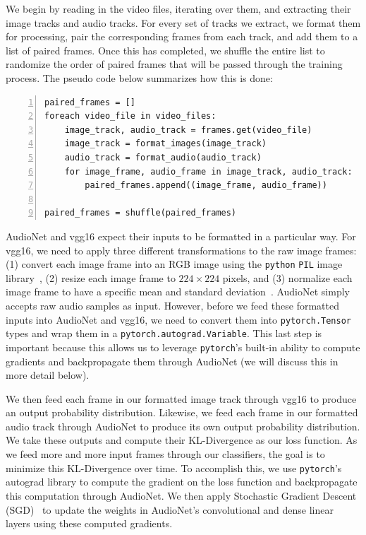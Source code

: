 \documentclass[12pt,twoside]{article}
\theoremstyle{plain}
\theoremstyle{definition}
\theoremstyle{remark}
\begin{document}
\noindent
We begin by reading in the video files, iterating over them, and extracting their image tracks and audio tracks.
For every set of tracks we extract, we format them for processing, pair the corresponding frames from each track, and add them to a list of paired frames.
Once this has completed, we shuffle the entire list to randomize the order of paired frames that will be passed through the training process.
The pseudo code below summarizes how this is done:

{\setlength{\fboxsep}{10pt}
\begin{Verbatim}[frame=leftline, numbers=left, xleftmargin=5mm]
paired_frames = []
foreach video_file in video_files:
    image_track, audio_track = frames.get(video_file)
    image_track = format_images(image_track)
    audio_track = format_audio(audio_track)
    for image_frame, audio_frame in image_track, audio_track:
        paired_frames.append((image_frame, audio_frame))

paired_frames = shuffle(paired_frames)
\end{Verbatim}
}

AudioNet and vgg16 expect their inputs to be formatted in a particular way.
For vgg16, we need to apply three different transformations to the raw image frames:
(1) convert each image frame into an RGB image using the \texttt{python} \texttt{PIL} image library~\cite{pil},
(2) resize each image frame to $224 \times 224$ pixels, and
(3) normalize each image frame to have a specific mean and standard deviation~\cite{vgg}.
AudioNet simply accepts raw audio samples as input.
However, before we feed these formatted inputs into AudioNet and vgg16, we need to convert them into \texttt{pytorch.Tensor} types and wrap them in a \texttt{pytorch.autograd.Variable}.
This last step is important because this allows us to leverage \texttt{pytorch}’s built-in ability to compute gradients and backpropagate them through AudioNet (we will discuss this in more detail below).

We then feed each frame in our formatted image track through vgg16 to produce an output probability distribution.
Likewise, we feed each frame in our formatted audio track through AudioNet to produce its own output probability distribution.
We take these outputs and compute their KL-Divergence as our loss function.
As we feed more and more input frames through our classifiers, the goal is to minimize this KL-Divergence over time.
To accomplish this, we use \texttt{pytorch}’s autograd library to compute the gradient on the loss function and backpropagate this computation through AudioNet.
We then apply Stochastic Gradient Descent (SGD)~\cite{Bottou:2010} to update the weights in AudioNet’s convolutional and dense linear layers using these computed gradients.
\end{document}
